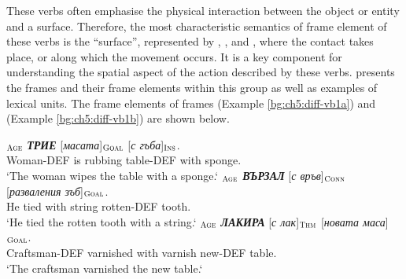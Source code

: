 \documentclass[output=paper,colorlinks,citecolor=brown]{langscibook}
\begin{document}
These verbs often emphasise the physical interaction between the object or entity and a surface. Therefore,  the most characteristic semantics of frame element of these verbs is the ``surface'', represented by , , and , where the contact takes place, or along which the movement occurs. It is a key component for understanding the spatial aspect of the action described by these verbs.  presents the frames and their frame elements within this group as well as examples of lexical units. The frame elements of frames  (Example \ref{bg:ch5:diff-vb1a}) and  (Example \ref{bg:ch5:diff-vb1b}) are shown below.

\begin{exe} 
\ex \label{bg:ch5:diff-vb1} 
\begin{xlist}
\ex \label{bg:ch5:diff-vb1a}
$_{\text{\textsc{Age}}}$ \textit{\textbf{ТРИЕ}} {[\textit{масата}]}$_{\text{\textsc{Goal}}}$ [\textit{с гъба}]$_{\text{\textsc{Ins}}}$.
\\
Woman-DEF {is rubbing} table-DEF {with sponge}. \\
\glt `The woman wipes the table with a sponge.` 
\ex \label{bg:ch5:diff-vb1b}
$_{\text{\textsc{Age}}}$ \textit{\textbf{ВЪРЗАЛ}} [\textit{с връв}]$_{\text{\textsc{Conn}}}$ {[\textit{разваления зъб}]}$_{\text{\textsc{Goal}}}$.
\\
He tied {with string} {rotten-DEF tooth}. \\
\glt `He tied the rotten tooth with a string.` 
\ex \label{bg:ch5:diff-vb1c} %
$_{\text{\textsc{Age}}}$ \textit{\textbf{ЛАКИРА}} [\textit{с лак}]$_{\text{\textsc{Thm}}}$ {[\textit{новата маса}]}$_{\text{\textsc{Goal}}}$.
\\
Craftsman-DEF varnished {with varnish} {new-DEF table}. \\
\glt `The craftsman varnished the new table.`
\end{xlist}
\end{exe}
\end{document}
